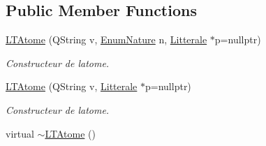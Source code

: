 \subsection*{Public Member Functions}
\begin{DoxyCompactItemize}
\item 
\hyperlink{class_l_t_atome_a533e5d85b12e1a9e902cc7d29c58868a}{L\+T\+Atome} (Q\+String v, \hyperlink{class_l_t_atome_a340480fc682a6d8fd819026d20278b49}{Enum\+Nature} n, \hyperlink{class_litterale}{Litterale} $\ast$p=nullptr)
\begin{DoxyCompactList}\small\item\em Constructeur de l\textquotesingle{}atome. \end{DoxyCompactList}\item 
\hyperlink{class_l_t_atome_a8b3d9c68655bf64d0924e892922c77f2}{L\+T\+Atome} (Q\+String v, \hyperlink{class_litterale}{Litterale} $\ast$p=nullptr)
\begin{DoxyCompactList}\small\item\em Constructeur de l\textquotesingle{}atome. \end{DoxyCompactList}\item 
virtual \hyperlink{class_l_t_atome_aff1cf3e8e7f7b6f0fcc7818e832ecd08}{$\sim$\+L\+T\+Atome} ()\hypertarget{class_l_t_atome_aff1cf3e8e7f7b6f0fcc7818e832ecd08}{}\label{class_l_t_atome_aff1cf3e8e7f7b6f0fcc7818e832ecd08}


\end{DoxyCompactItemize}
